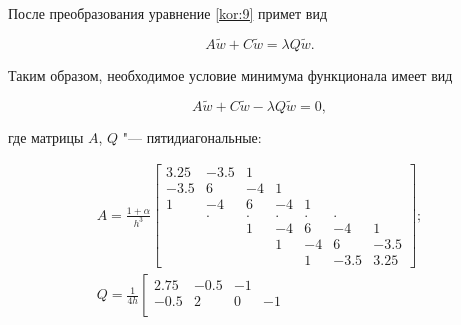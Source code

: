 После преобразования уравнение \eqref{kor:9} примет вид

\begin{equation}

A\tilde{w}+C\tilde{w} = \lambda Q \tilde{w}.

\label{kor:15}

\end{equation}



Таким образом, необходимое условие минимума функционала имеет вид

$$ A\tilde{w} + C\tilde{w} - \lambda Q \tilde{w} = 0,$$

где матрицы $A$, $Q$ "--- пятидиагональные:



\begin{gather*}

A=\frac{1+\alpha}{h^3} \left[\begin{array}{rrrrrrr}

                    3.25  & -3.5  &  1   &  \,  &  \,  &  \,   &  \, \\

                    -3.5  & 6     & -4   &  1   &  \,  &  \,   &  \, \\

                    1     & -4    &  6   & -4   &  1   &  \,   &  \, \\

                    \,    &  .    &  .   &  .   &  .   &  .    &  \,  \\

                    \,    &  \,   &  1   & -4   &  6   & -4    &  1  \\

                    \,    &  \,   &  \,  &  1   & -4   &  6    &  -3.5  \\

                    \,    &  \,   &  \,  &  \,  &  1   & -3.5  &  3.25

                \end{array}\right];

\\

Q=\frac{1}{4h} \left[\begin{array}{rrrrrrr}

                    2.75  & -0.5  & -1 & \, & \, & \,    & \, \\

                    -0.5  & 2     & 0  & -1 & \, & \,    & \, \\


\end{array}
\end{gather*}
